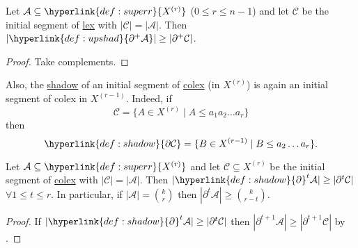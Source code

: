\documentclass{article}
\let\subset\subseteq
\begin{document}
\begin{ncor}\label{cor:1.8}
  Let $\mathcal{A} \subset \hyperlink{def:superr}{X^{(r)}}$ ($0 \leq r \leq n-1$) and let $\mathcal{C}$ be the initial segment of \hyperlink{def:lex}{lex} with $|\mathcal{C}| = |\mathcal{A}|$.
  Then $|\hyperlink{def:upshad}{\partial^+ \mathcal{A}}| \geq |\partial^+ \mathcal{C}|$.
\end{ncor}
\begin{proof}
  Take complements.
\end{proof}
Also, the \hyperlink{def:shadow}{shadow} of an initial segment of \hyperlink{def:colex}{colex} (in \hyperlink{def:superr}{$X^{(r)}$}) is again an initial segment of colex in $X^{(r-1)}$.
Indeed, if
\begin{equation*}\mathcal{C} = \{A \in X^{(r)} \mid A \leq a_1 a_2 \dots a_r\}\end{equation*}
then
\begin{equation*}\hyperlink{def:shadow}{\partial \mathcal{C}} = \{B \in X^{(r-1)} \mid B \leq a_2 \dots a_r\}.\end{equation*}

\begin{ncor}\label{cor:1.9}
  Let $\mathcal{A} \subset \hyperlink{def:superr}{X^{(r)}}$ and let $\mathcal{C} \subset X^{(r)}$ be the initial segment of \hyperlink{def:colex}{colex} with $|\mathcal{C}| = |\mathcal{A}|$.
  Then $|\hyperlink{def:shadow}{\partial}^t \mathcal{A}| \geq |\partial^t \mathcal{C}|$ $\forall 1 \leq t \leq r$.
  In particular, if $|\mathcal{A}| = \binom{k}{r}$ then $|\partial^t \mathcal{A}| \geq \binom{k}{r-t}$.
\end{ncor}
\begin{proof}
  If $|\hyperlink{def:shadow}{\partial}^t \mathcal{A}| \geq |\partial^t \mathcal{C}|$ then $|\partial^{t+1} \mathcal{A}| \geq |\partial^{t+1} \mathcal{C}|$ by .
\end{proof}
\end{document}
